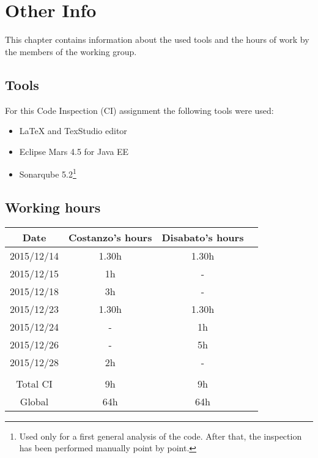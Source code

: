 \documentclass[\mainpath/main]{subfiles}
\begin{document}
\chapter{Other Info}
\label{OtherInfo}

\setmyfancystyle

This chapter contains information about the used tools and the hours of work by the members of the working group.

\section{Tools}
For this Code Inspection (CI) assignment the following tools were used:
\begin{itemize}
	\item \LaTeX{} and TexStudio editor
	\item Eclipse Mars 4.5 for Java EE
	\item Sonarqube 5.2\footnote{Used only for a first general analysis of the code. After that, the inspection has been performed manually point by point.}
\end{itemize}

\clearpage

\section{Working hours}
\begin{table}[h!]
	\centering
\begin{tabular}{cccc}
\hline
Date       & Costanzo's hours & Disabato's hours  & \\ \hline
2015/12/14 & 1.30h 			  & 1.30h 			  & \\ \hline
2015/12/15 & 1h 			  & - 				  & \\ \hline 
2015/12/18 & 3h               & -                 & \\ \hline
2015/12/23 & 1.30h 			  & 1.30h 			  & \\ \hline     
2015/12/24 & - 			  	  & 1h		 		  & \\ \hline 
2015/12/26 & -		 		  & 5h 			 	  & \\ \hline
2015/12/28 & 2h				  & -				  & \\ \hline
\\
Total CI   & 9h 		      & 9h 			 	  & \\ \hline
Global 	   & 64h 		 	  & 64h 			  & \\ \hline

\end{tabular}
\end{table}
\end{document}
